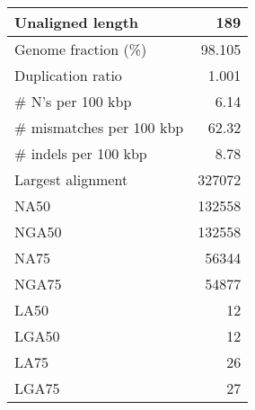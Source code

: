 \documentclass[12pt,a4paper]{article}
\begin{document}
\begin{table}[ht]
\begin{center}
\begin{tabular}{|l*{1}{|r}|}
Unaligned length & 189 \\ \hline
Genome fraction (\%) & 98.105 \\ \hline
Duplication ratio & 1.001 \\ \hline
\# N's per 100 kbp & 6.14 \\ \hline
\# mismatches per 100 kbp & 62.32 \\ \hline
\# indels per 100 kbp & 8.78 \\ \hline
Largest alignment & 327072 \\ \hline
NA50 & 132558 \\ \hline
NGA50 & 132558 \\ \hline
NA75 & 56344 \\ \hline
NGA75 & 54877 \\ \hline
LA50 & 12 \\ \hline
LGA50 & 12 \\ \hline
LA75 & 26 \\ \hline
LGA75 & 27 \\ \hline
\end{tabular}
\end{center}
\end{table}
\end{document}
